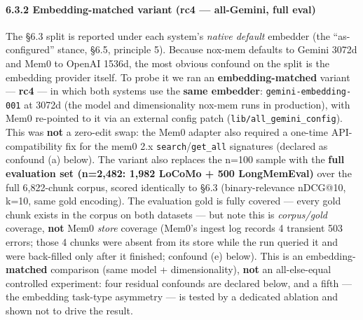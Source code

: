 \documentclass[
]{article}
\begin{document}
\paragraph{6.3.2 Embedding-matched variant (rc4 --- all-Gemini, full
eval)}\label{embedding-matched-variant-rc4-all-gemini-full-eval}

The §6.3 split is reported under each system's \emph{native default}
embedder (the ``as-configured'' stance, §6.5, principle 5). Because
nox-mem defaults to Gemini 3072d and Mem0 to OpenAI 1536d, the most
obvious confound on the split is the embedding provider itself. To probe
it we ran an \textbf{embedding-matched} variant --- \textbf{rc4} --- in
which both systems use the \textbf{same embedder}:
\texttt{gemini-embedding-001} at 3072d (the model and dimensionality
nox-mem runs in production), with Mem0 re-pointed to it via an external
config patch (\texttt{lib/all\_gemini\_config}). This was \textbf{not} a
zero-edit swap: the Mem0 adapter also required a one-time
API-compatibility fix for the mem0 2.x \texttt{search}/\texttt{get\_all}
signatures (declared as confound (a) below). The variant also replaces
the n=100 sample with the \textbf{full evaluation set (n=2,482: 1,982
LoCoMo + 500 LongMemEval)} over the full 6,822-chunk corpus, scored
identically to §6.3 (binary-relevance nDCG@10, k=10, same gold
encoding). The evaluation gold is fully covered --- every gold chunk
exists in the corpus on both datasets --- but note this is
\emph{corpus/gold} coverage, \textbf{not} Mem0 \emph{store} coverage
(Mem0's ingest log records 4 transient 503 errors; those 4 chunks were
absent from its store while the run queried it and were back-filled only
after it finished; confound (e) below). This is an
embedding-\textbf{matched} comparison (same model + dimensionality),
\textbf{not} an all-else-equal controlled experiment: four residual
confounds are declared below, and a fifth --- the embedding task-type
asymmetry --- is tested by a dedicated ablation and shown not to drive
the result.
\end{document}
